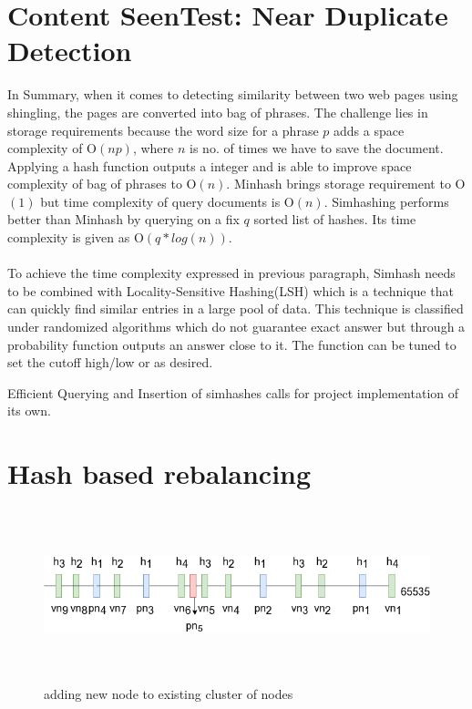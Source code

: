 \section{Content SeenTest: Near Duplicate Detection}\label{handle_dedupe}
\noindent
In Summary, when it comes to detecting similarity between two web pages using shingling, the pages are converted into bag of phrases. The challenge lies in storage requirements because the word size for a phrase $p$ adds a space complexity of O$(np)$, where $n$ is no. of times we have to save the document. Applying a hash function outputs a integer and is able to improve space complexity of bag of phrases to O$(n)$. Minhash\cite{dedupe} brings storage requirement to O$(1)$ but time complexity of query documents is O$(n)$. Simhashing\cite{dedupe} performs better than Minhash by querying on a fix $q$ sorted list of hashes. Its time complexity is given as O$(q * log(n))$.
\\
\\
To achieve the time complexity expressed in previous paragraph, Simhash needs to be
combined with Locality-Sensitive Hashing(LSH)\cite{lsh} which is a technique that
can quickly find similar entries in a large pool of data. This technique is
classified under randomized algorithms which do not guarantee exact answer but
through a probability function outputs an answer close to it. The function can be
tuned to set the cutoff high/low or as desired.

Efficient Querying and Insertion of simhashes calls for project implementation of its own.

\pagebreak

\section{Hash based rebalancing}
\begin{figure}[h!]
  \centering
  \includegraphics[width=12cm,height=5cm,keepaspectratio]{../media/crawler/addingnode.png}
  \caption{adding new node to existing cluster of nodes}
  \label{fig:addingnode}
\end{figure}

